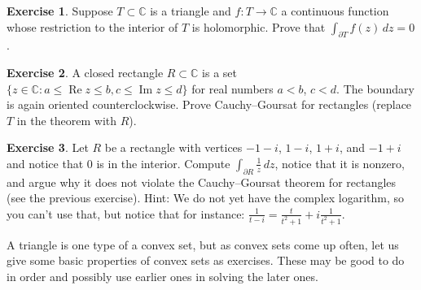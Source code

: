 \documentclass[12pt,openany]{book}
\renewcommand{\Re}{\operatorname{Re}}
\renewcommand{\Im}{\operatorname{Im}}
\newcommand{\C}{{\mathbb{C}}}
\theoremstyle{plain}
\theoremstyle{remark}
\theoremstyle{definition}
\newenvironment{exbox}{%
    \def\FrameCommand{\vrule width 1pt \relax\hspace{10pt}}%
    \MakeFramed{\advance\hsize-\width\FrameRestore}%
}{%
    \endMakeFramed
}
\theoremstyle{exercise}
\newtheorem{exercise}{Exercise}[section]
\theoremstyle{example}
\begin{document}
\begin{exbox}
\begin{exercise}
Suppose $T \subset \C$ is a triangle and $f \colon T \to \C$ a
continuous function whose restriction to the interior of $T$ is holomorphic.
Prove that $\int_{\partial T} f(z) \, dz = 0$.
\end{exercise}

\begin{exercise}
A closed rectangle $R \subset \C$ is a set
$\bigl\{ z \in \C : a \leq \Re z \leq b , c \leq \Im z \leq d \bigr\}$
for real numbers $a < b$, $c < d$.  The boundary
is again oriented counterclockwise.  Prove Cauchy--Goursat for rectangles
(replace $T$ in the theorem with $R$).
\end{exercise}

\begin{exercise}
Let $R$ be a rectangle with vertices
$-1-i$, $1-i$, $1+i$, and $-1+i$ and notice that $0$ is in the interior.
Compute $\int_{\partial R} \frac{1}{z} \, dz$,
notice that it is nonzero, and argue why it does not violate the
Cauchy--Goursat theorem for rectangles (see the previous exercise).
Hint: We do not yet have the complex logarithm, so you can't use that,
but notice that for instance:
$\frac{1}{t-i} = \frac{t}{t^2+1} + i \frac{1}{t^2+1}$.
\end{exercise}
\end{exbox}

A triangle is one type of a convex set, but as convex sets come up
often, let us give some basic properties of convex sets as exercises.
These may be good to do in order and possibly use earlier ones in solving
the later ones.
\end{document}
